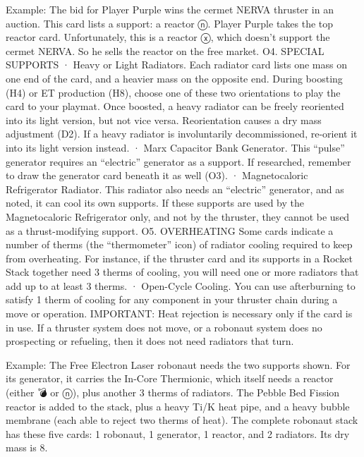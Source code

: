 \documentclass[a4paper]{book}
\begin{document}
Example: The bid for Player Purple wins the cermet NERVA thruster in an auction. This card lists a support: a reactor ⓝ. Player Purple takes the top reactor card. Unfortunately, this is a reactor ⓧ, which doesn’t support the cermet NERVA. So he sells the reactor on the free market.
O4. SPECIAL SUPPORTS
·       Heavy or Light Radiators. Each radiator card lists one mass on one end of the card, and a heavier mass on the opposite end. During boosting (H4) or ET production (H8), choose one of these two orientations to play the card to your playmat. Once boosted, a heavy radiator can be freely reoriented into its light version, but not vice versa. Reorientation causes a dry mass adjustment (D2). If a heavy radiator is involuntarily decommissioned, re-orient it into its light version instead.
·       Marx Capacitor Bank Generator. This “pulse” generator requires an “electric” generator as a support. If researched, remember to draw the generator card beneath it as well (O3).
·   	Magnetocaloric Refrigerator Radiator. This radiator also needs an “electric” generator, and as noted, it can cool its own supports. If these supports are used by the Magnetocaloric Refrigerator only, and not by the thruster, they cannot be used as a thrust-modifying support.
O5. OVERHEATING
Some cards indicate a number of therms (the “thermometer” icon) of radiator cooling required to keep from overheating. For instance, if the thruster card and its supports in a Rocket Stack together need 3 therms of cooling, you will need one or more radiators that add up to at least 3 therms.
·       Open-Cycle Cooling. You can use afterburning to satisfy 1 therm of cooling for any component in your thruster chain during a move or operation.
IMPORTANT: Heat rejection is necessary only if the card is in use. If a thruster system does not move, or a robonaut system does no prospecting or refueling, then it does not need radiators that turn.

Example: The Free Electron Laser robonaut needs the two supports shown. For its generator, it carries the In-Core Thermionic, which itself needs a reactor (either 💣 or ⓝ), plus another 3 therms of radiators. The Pebble Bed Fission reactor is added to the stack, plus a heavy Ti/K heat pipe, and a heavy bubble membrane (each able to reject two therms of heat). The complete robonaut stack has these five cards: 1 robonaut, 1 generator, 1 reactor, and 2 radiators. Its dry mass is 8.
\end{document}
